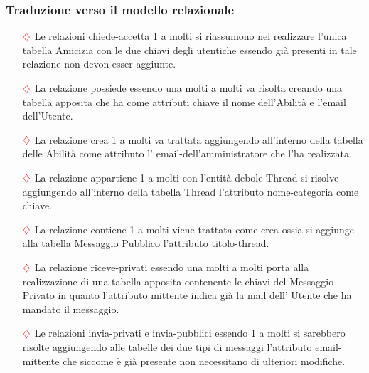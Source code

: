 \subsubsection{Traduzione verso il modello relazionale}

\begin{itemize}
\item[$\textcolor{red}{\diamondsuit}$] Le relazioni chiede-accetta 1 a molti si riassumono nel realizzare l'unica tabella Amicizia con le due chiavi degli utentiche essendo già presenti in tale relazione non devon esser aggiunte.
\item[$\textcolor{red}{\diamondsuit}$] La relazione possiede essendo una molti a molti va risolta creando una tabella apposita che ha come attributi chiave il nome dell'Abilità e l'email dell'Utente. 
\item[$\textcolor{red}{\diamondsuit}$] La relazione crea 1 a molti va trattata aggiungendo all'interno della tabella delle Abilità come attributo l' email-dell'amministratore che l'ha realizzata.
\item[$\textcolor{red}{\diamondsuit}$] La relazione appartiene 1 a molti con l'entità debole Thread si risolve aggiungendo all'interno della tabella Thread l'attributo nome-categoria come chiave.
\item[$\textcolor{red}{\diamondsuit}$] La relazione contiene 1 a molti viene trattata come crea ossia si aggiunge alla tabella Messaggio Pubblico l'attributo titolo-thread.
\item[$\textcolor{red}{\diamondsuit}$] La relazione riceve-privati essendo una molti a molti porta alla realizzazione di una tabella apposita contenente le chiavi del Messaggio Privato in quanto l'attributo mittente indica già la mail dell' Utente che ha mandato il messaggio.
\item[$\textcolor{red}{\diamondsuit}$] Le relazioni invia-privati e invia-pubblici essendo 1 a molti si sarebbero risolte aggiungendo alle tabelle dei due tipi di messaggi l'attributo email-mittente che siccome è già presente non necessitano di ulteriori modifiche.
 \end{itemize}

\clearpage

